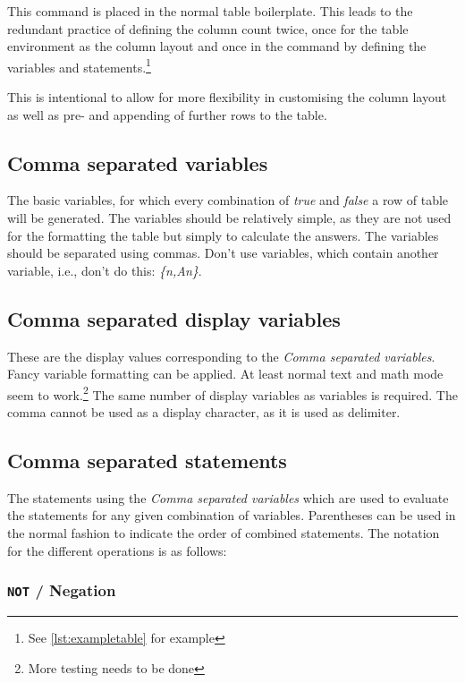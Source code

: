 \documentclass[a4paper]{article}
\begin{document}
	This command is placed in the normal table boilerplate. This leads to the redundant practice of defining the column count twice, once for the table environment as the column layout and once in the command by defining the variables and statements.\footnote{See \autoref{lst:exampletable} for example}

	This is intentional to allow for more flexibility in customising the column layout as well as pre- and appending of further rows to the table.

	\subsection{Comma separated variables}

	The basic variables, for which every combination of \emph{true} and \emph{false} a row of table will be generated. The variables should be relatively simple, as they are not used for the formatting the table but simply to calculate the answers. The variables should be separated using commas. Don't use variables, which contain another variable, i.e., don't do this: \emph{\{n,An\}}.

	\subsection{Comma separated display variables}

	These are the display values corresponding to the \emph{Comma separated variables}. Fancy variable formatting can be applied. At least normal text and math mode seem to work.\footnote{More testing needs to be done}
	The same number of display variables as variables is required. The comma cannot be used as a display character, as it is used as delimiter.

	\subsection{Comma separated statements}

	The statements using the \emph{Comma separated variables} which are used to evaluate the statements for any given combination of variables. Parentheses can be used in the normal fashion to indicate the order of combined statements. The notation for the different operations is as follows:

	\subsubsection{\texttt{NOT} / Negation}
\end{document}
